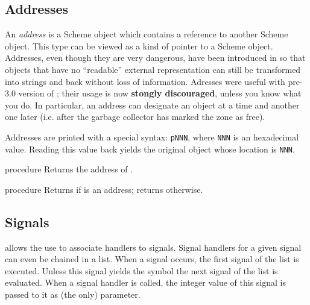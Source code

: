 
\subsection{Addresses}

\label{addresses}
An {\em address} is a Scheme object which contains a reference to
another Scheme object. This type can be viewed as a kind of pointer to
a Scheme object.  Addresses, even though they are very dangerous, have
been introduced in {\stk} so that objects that have no ``readable''
external representation can still be transformed into strings and back
without loss of information. Adresses were useful with pre-3.0 version
of {\stk}; their usage is now {\bf stongly discouraged}, unless you know what you
do. In particular, an address can designate an object at a time and
another one later (i.e. after the garbage collector has marked the zone
as free).

Addresses are printed with a special syntax: {\tt {\sharpsign}pNNN},
where {\tt NNN} is an hexadecimal value. Reading this value back
yields the original object whose location is {\tt NNN}.

\begin{entry}{%
 {procedure}}
\saut
Returns the address of .
\end{entry}

\begin{entry}{%
 {procedure}}
\saut
Returns {\schtrue} if  is an address; returns {\schfalse} otherwise.
\end{entry}

\subsection{Signals}

\label{signals}
{\stk} allows the use to associate handlers to signals. Signal
handlers for a given signal can even be chained in a list. When a
signal occurs, the first signal of the list is executed. Unless this
signal yields the symbol  the next signal of the list is
evaluated. When a signal handler is called, the integer value of this
signal is passed to it as (the only) parameter.

